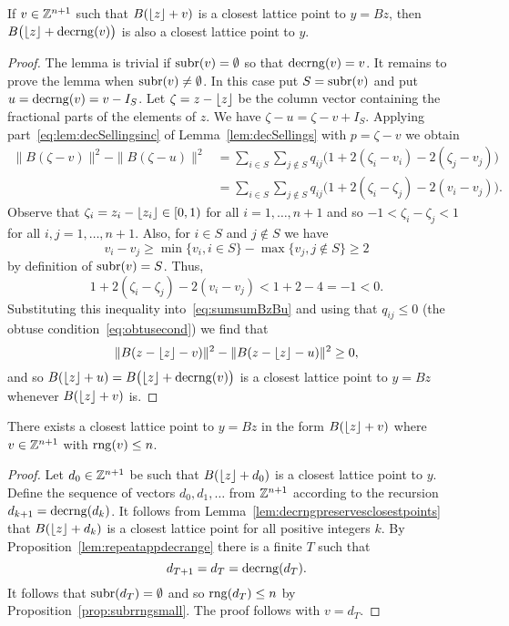 \documentclass[final,leqno]{siamltex}
\begin{document}
\begin{lemma}\label{lem:decrngpreservesclosestpoints}
If $v \in {\mathbb Z}^{n+1}$ such that $B({\left\lfloor z \right\rfloor} + v)$ is a closest lattice point to $y = Bz$, then $B\big({\left\lfloor z \right\rfloor} + \operatorname{decrng}(v)\big)$ is also a closest lattice point to $y$.
\end{lemma}
\begin{proof}
The lemma is trivial if $\operatorname{subr}(v) = \emptyset$ so that $\operatorname{decrng}(v) = v$.  It remains to prove the lemma when $\operatorname{subr}(v) \neq \emptyset$.  In this case put $S = \operatorname{subr}(v)$ and put $u = \operatorname{decrng}(v) = v - I_S$.  Let $\zeta = z - {\left\lfloor z \right\rfloor}$ be the column vector containing the fractional parts of the elements of $z$.  We have $\zeta - u = \zeta - v + I_S$.  Applying part~\ref{eq:lem:decSellingsinc} of Lemma~\ref{lem:decSellings} with $p = \zeta - v$ we obtain
\begin{align}
\|B(\zeta - v)\|^2 - \|B(\zeta - u)\|^2 &= \sum_{i \in S}\sum_{j \notin S}q_{ij}\big(1 + 2(\zeta_i - v_i)  - 2(\zeta_j - v_j) \big) \nonumber \\
&= \sum_{i \in S}\sum_{j \notin S}q_{ij}\big(1 + 2(\zeta_i-\zeta_j) - 2(v_i - v_j)\big). \label{eq:sumsumBzBu}
\end{align}
Observe that $\zeta_i =  z_i - {\left\lfloor z_i \right\rfloor} \in [0,1)$ for all $i=1,\dots,n+1$ and so $-1 < \zeta_i-\zeta_j < 1$ for all $i,j=1,\dots,n+1$.  Also, for $i \in S$ and $j\notin S$ we have 
\[
v_i - v_j \geq \min\{ v_i, i \in S\} - \max\{v_j, j \notin S\} \geq 2
\]
by definition of $\operatorname{subr}(v) = S$.  Thus,
\[
1 + 2(\zeta_i-\zeta_j) - 2(v_i - v_j) < 1 + 2 - 4 = -1 < 0.
\]
Substituting this inequality into~\eqref{eq:sumsumBzBu} and using that $q_{ij} \leq 0$ (the obtuse condition~\eqref{eq:obtusecond}) we find that
\[
\|B(z - {\left\lfloor z \right\rfloor} - v)\|^2 - \|B(z - {\left\lfloor z \right\rfloor} - u)\|^2 \geq 0,
\]
and so $B({\left\lfloor z \right\rfloor} + u) = B\big({\left\lfloor z \right\rfloor} + \operatorname{decrng}(v)\big)$ is a closest lattice point to $y = Bz$ whenever $B({\left\lfloor z \right\rfloor} + v)$ is.
\end{proof}

\begin{lemma}\label{lem:roundzclose}
There exists a closest lattice point to $y = Bz$ in the form $B({\left\lfloor z \right\rfloor} + v)$ where $v \in {\mathbb Z}^{n+1}$ with $\operatorname{rng}(v) \leq n$.
\end{lemma}
\begin{proof}
Let $d_0 \in {\mathbb Z}^{n+1}$ be such that $B({\left\lfloor z \right\rfloor} + d_0)$ is a closest lattice point to $y$. Define the sequence of vectors $d_0,d_1,\dots$ from ${\mathbb Z}^{n+1}$ according to the recursion $d_{k+1} = \operatorname{decrng}(d_k)$.  It follows from Lemma~\ref{lem:decrngpreservesclosestpoints} that $B({\left\lfloor z \right\rfloor} + d_{k})$ is a closest lattice point for all positive integers $k$.  By Proposition~\ref{lem:repeatappdecrange} there is a finite $T$ such that 
\[
d_{T+1}=d_T=\operatorname{decrng}(d_T).
\]  
It follows that $\operatorname{subr}(d_T) = \emptyset$ and so $\operatorname{rng}(d_T) \leq n$ by Proposition~\ref{prop:subrrngsmall}.  The proof follows with $v = d_T$.   
\end{proof}
\end{document}

